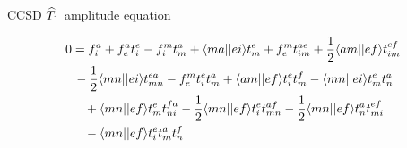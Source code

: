 \begin{frame}{CCSD $\widehat{T}_1$ amplitude equation }

\begin{align*}
    0 &= f_{i}^a + f_{e}^a t_i^e - f_{i}^mt_m^a + \langle ma||ei\rangle t_m^e 
        + f_{e}^m t_{im}^{ae} + \frac{1}{2} \langle am||ef\rangle t_{im}^{ef} \notag \\
        &\, - \frac{1}{2} \langle mn||ei\rangle t_{mn}^{ea} - f_{e}^m t_i^e t_m^a
        + \langle am||ef\rangle t_i^e t_m^f - \langle mn||ei\rangle t_m^e t_n^a  \notag \\
        & \quad + \langle mn||ef\rangle t_m^e t_{ni}^{fa}
        - \frac{1}{2} \langle mn||ef\rangle t_i^e t_{mn}^{af}
        - \frac{1}{2} \langle mn||ef\rangle t_n^a t_{mi}^{ef}\notag \\
        & \quad  - \langle mn||ef\rangle t_i^e t_m^a t_n^f
\end{align*}


\end{frame}

    
